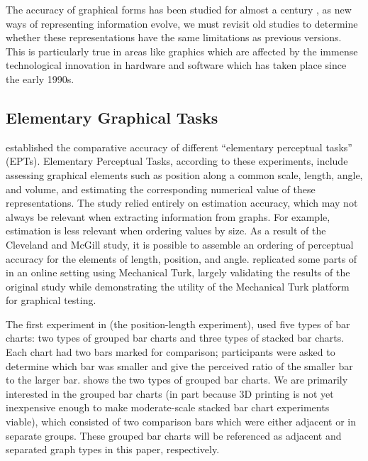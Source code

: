 \documentclass[letterpaper,inpress,dvipsnames]{jdsart}
\begin{document}
The accuracy of graphical forms has been studied for almost a century \citep{vonhuhnFurtherStudiesGraphic1927, eellsRelativeMeritsCircles1926, croxtonGraphicComparisonsBars1932, croxtonBarChartsCircle1927}, as new ways of representing information evolve, we must revisit old studies to determine whether these representations have the same limitations as previous versions. This is particularly true in areas like graphics which are affected by the immense technological innovation in hardware and software which has taken place since the early 1990s.

\hypertarget{elementary-graphical-tasks}{%
\subsection{Elementary Graphical Tasks}\label{elementary-graphical-tasks}}

\citet{clevelandGraphical1984} established the comparative accuracy of different ``elementary perceptual tasks'' (EPTs).
Elementary Perceptual Tasks, according to these experiments, include assessing graphical elements such as position along a common scale, length, angle, and volume, and estimating the corresponding numerical value of these representations.
The study relied entirely on estimation accuracy, which may not always be relevant when extracting information from graphs. For example, estimation is less relevant when ordering values by size.
As a result of the Cleveland and McGill \citeyearpar{clevelandGraphical1984} study, it is possible to assemble an ordering of perceptual accuracy for the elements of length, position, and angle.
\citet{heerCrowdsourcingGraphicalPerception2010b} replicated some parts of \citet{clevelandGraphical1984} in an online setting using Mechanical Turk, largely validating the results of the original study while demonstrating the utility of the Mechanical Turk platform for graphical testing.

The first experiment in \citet{clevelandGraphical1984} (the position-length experiment), used five types of bar charts: two types of grouped bar charts and three types of stacked bar charts.
Each chart had two bars marked for comparison; participants were asked to determine which bar was smaller and give the perceived ratio of the smaller bar to the larger bar.  shows the two types of grouped bar charts.
We are primarily interested in the grouped bar charts (in part because 3D printing is not yet inexpensive enough to make moderate-scale stacked bar chart experiments viable), which consisted of two comparison bars which were either adjacent or in separate groups.
These grouped bar charts will be referenced as adjacent and separated graph types in this paper, respectively.
\end{document}
